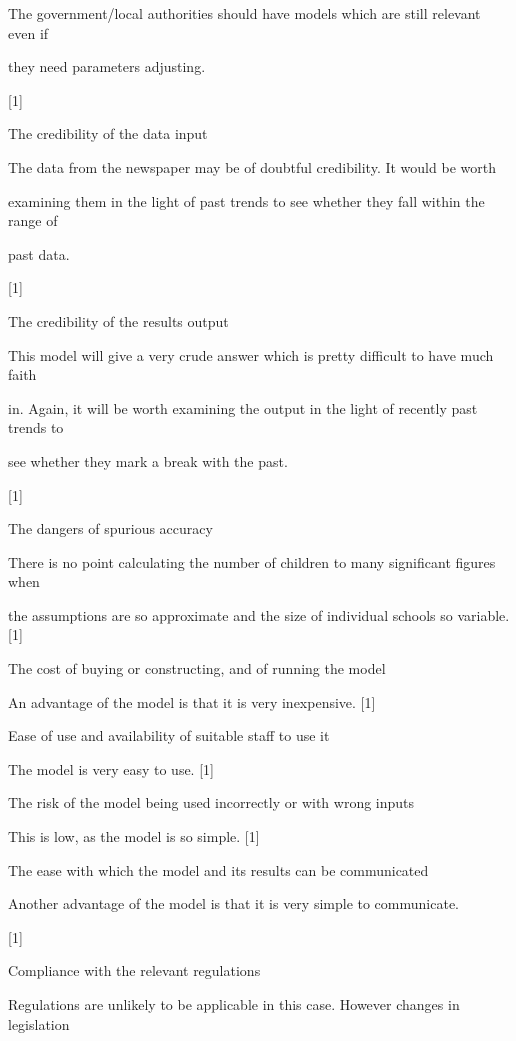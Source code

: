 \documentclass[a4paper,12pt]{article}
\begin{document}
The government/local authorities should have models which are still relevant even if

they need parameters adjusting.

[1]

The credibility of the data input

The data from the newspaper may be of doubtful credibility. It would be worth

examining them in the light of past trends to see whether they fall within the range of

past data.

[1]

The credibility of the results output

This model will give a very crude answer which is pretty difficult to have much faith

in. Again, it will be worth examining the output in the light of recently past trends to

see whether they mark a break with the past.

[1]

The dangers of spurious accuracy

There is no point calculating the number of children to many significant figures when

the assumptions are so approximate and the size of individual schools so variable. [1]

The cost of buying or constructing, and of running the model

An advantage of the model is that it is very inexpensive. [1]

Ease of use and availability of suitable staff to use it

The model is very easy to use. [1]

The risk of the model being used incorrectly or with wrong inputs

This is low, as the model is so simple. [1]


The ease with which the model and its results can be communicated

Another advantage of the model is that it is very simple to communicate.

[1]

Compliance with the relevant regulations

Regulations are unlikely to be applicable in this case. However changes in legislation
\end{document}
